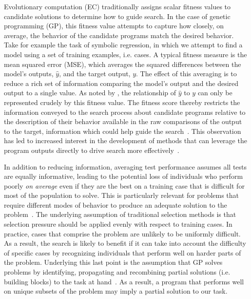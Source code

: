 \documentclass[twoside]{article}
\begin{document}
Evolutionary computation (EC) traditionally assigns scalar fitness values to candidate solutions to determine how to guide search. In the case of genetic programming (GP), this fitness value attempts to capture how closely, on average, the behavior of the candidate programs match the desired behavior. Take for example the task of symbolic regression, in which we attempt to find a model using a set of training examples, i.e. cases. A typical fitness measure is the mean squared error (MSE), which averages the squared differences between the model's outputs, $\hat{y}$, and the target output, $y$. The effect of this averaging is to reduce a rich set of information comparing the model's output and the desired output to a single value. As noted by \cite{krawiec_behavioral_2016}, the relationship of $\hat{y}$ to $y$ can only be represented crudely by this fitness value. The fitness score thereby restricts the information conveyed to the search process about candidate programs relative to the description of their behavior available in the raw comparisons of the output to the target, information which could help guide the search~\citep{krawiec_automatic_2015}. This observation has led to increased interest in the development of methods that can leverage the program outputs directly to drive search more effectively~\citep{vanneschi_survey_2014}.

In addition to reducing information, averaging test performance assumes all tests are equally informative, leading to the potential loss of individuals who perform poorly {\it on average} even if they are the best on a training case that is difficult for most of the population to solve. This is particularly relevant for problems that require different modes of behavior to produce an adequate solution to the problem~\citep{spector_assessment_2012}. The underlying assumption of traditional selection methods is that selection pressure should be applied evenly with respect to training cases. In practice, cases that comprise the problem are unlikely to be uniformly difficult. As a result, the search is likely to benefit if it can take into account the difficulty of specific cases by recognizing individuals that perform well on harder parts of the problem. Underlying this last point is the assumption that GP solves problems by identifying, propagating and recombining partial solutions (i.e. building blocks) to the task at hand~\citep{poli_schema_1998}. As a result, a program that performs well on unique subsets of the problem may imply a partial solution to our task. 
\end{document}
